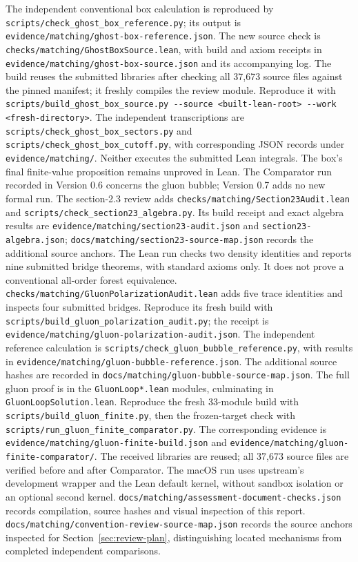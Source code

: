\documentclass[11pt]{article}
\newcommand{\code}[1]{{\small\nolinkurl{#1}}}
\begin{document}
The independent conventional box calculation is reproduced by
\code{scripts/check_ghost_box_reference.py}; its output is
\code{evidence/matching/ghost-box-reference.json}.
The new source check is \code{checks/matching/GhostBoxSource.lean}, with
build and axiom receipts in \code{evidence/matching/ghost-box-source.json}
and its accompanying log. The build reuses the submitted libraries after
checking all 37,673 source files against the pinned manifest; it freshly
compiles the review module. Reproduce it with
\code{scripts/build_ghost_box_source.py --source <built-lean-root> --work <fresh-directory>}.
The independent transcriptions are
\code{scripts/check_ghost_box_sectors.py} and
\code{scripts/check_ghost_box_cutoff.py}, with corresponding JSON records
under \code{evidence/matching/}. Neither executes the submitted Lean
integrals. The box's final finite-value proposition remains unproved in
Lean. The Comparator run recorded in Version 0.6 concerns the gluon bubble;
Version 0.7 adds no new formal run.
The section-2.3 review adds \code{checks/matching/Section23Audit.lean}
and \code{scripts/check_section23_algebra.py}. Its build receipt and exact
algebra results are \code{evidence/matching/section23-audit.json} and
\code{section23-algebra.json}; \code{docs/matching/section23-source-map.json}
records the additional source anchors. The Lean run checks two density
identities and reports nine submitted bridge theorems, with standard axioms
only. It does not prove a conventional all-order forest equivalence.
\code{checks/matching/GluonPolarizationAudit.lean} adds five trace identities and inspects four submitted bridges. Reproduce its fresh build with \code{scripts/build_gluon_polarization_audit.py}; the receipt is \code{evidence/matching/gluon-polarization-audit.json}. The independent reference calculation is \code{scripts/check_gluon_bubble_reference.py}, with results in \code{evidence/matching/gluon-bubble-reference.json}. The additional source hashes are recorded in \code{docs/matching/gluon-bubble-source-map.json}. The full gluon proof is in the \code{GluonLoop*.lean} modules, culminating in
\code{GluonLoopSolution.lean}. Reproduce the fresh 33-module build with
\code{scripts/build_gluon_finite.py}, then the frozen-target check with
\code{scripts/run_gluon_finite_comparator.py}. The corresponding evidence is
\code{evidence/matching/gluon-finite-build.json} and
\code{evidence/matching/gluon-finite-comparator/}. The received libraries are
reused; all 37,673 source files are verified before and after Comparator.
The macOS run uses upstream's development wrapper and the Lean default
kernel, without sandbox isolation or an optional second kernel.
\code{docs/matching/assessment-document-checks.json} records compilation,
source hashes and visual inspection of this report.
\code{docs/matching/convention-review-source-map.json} records the source
anchors inspected for Section~\ref{sec:review-plan}, distinguishing located
mechanisms from completed independent comparisons.
\end{document}
